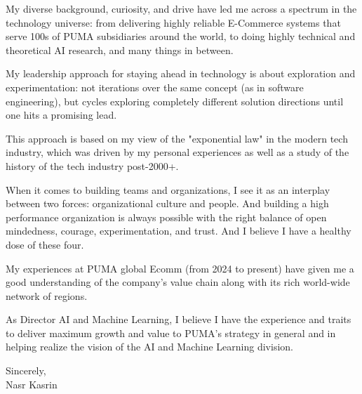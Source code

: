 My diverse background, curiosity, and drive have led me across a spectrum in the technology universe: from delivering highly reliable E-Commerce systems that serve 100s of PUMA subsidiaries around the world, to doing highly technical and theoretical AI research, and many things in between.
 
My leadership approach for staying ahead in technology is about exploration and experimentation: not iterations over the same concept (as in software engineering), but cycles exploring completely different solution directions until one hits a promising lead.

This approach is based on my view of the "exponential law" in the modern tech industry, which was driven by my personal experiences as well as a study of the history of the tech industry post-2000+.

When it comes to building teams and organizations, I see it as an interplay between two forces: organizational culture and people. And building a high performance organization is always possible with the right balance of open mindedness, courage, experimentation, and trust. And I believe I have a healthy dose of these four.

My experiences at PUMA global Ecomm (from 2024 to present) have given me a good understanding of the company’s value chain along with its rich world-wide network of regions. 

As Director AI and Machine Learning, I believe I have the experience and traits to deliver maximum growth and value to PUMA’s strategy in general and in helping realize the vision of the AI and Machine Learning division. 

\vspace{5ex}

Sincerely,\\
	
Nasr Kasrin

